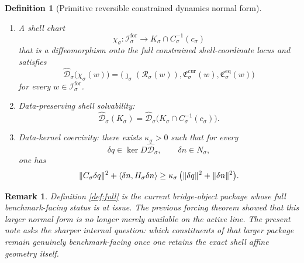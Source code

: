 \documentclass[11pt]{article}
\newcommand{\ForSpace}[1]{\mathcal I_{#1}^{\mathrm{for}}}
\newcommand{\Reduction}[1]{\mathcal R_{#1}}
\newcommand{\CurrentCarrier}[1]{\mathfrak C_{#1}^{\mathrm{cur}}}
\newcommand{\EqCarrier}[1]{\mathfrak C_{#1}^{\mathrm{eq}}}
\newcommand{\CoordSpace}[1]{Q_{#1}}
\newcommand{\CoordBody}[1]{K_{#1}}
\newcommand{\NormalSpace}[1]{N_{#1}}
\newcommand{\NormalBody}[1]{B_{#1}}
\newcommand{\AffineData}[1]{\widehat{\mathcal D}_{#1}}
\newcommand{\ConstraintMap}[1]{C_{#1}}
\newcommand{\ConstraintValue}[1]{c_{#1}}
\newcommand{\NormalOperator}[1]{H_{#1}}
\newcommand{\TimeRev}[1]{\tau_{#1}}
\newcommand{\ShellChart}[1]{\chi_{#1}}
\newtheorem{definition}{Definition}
\newtheorem{remark}{Remark}
\begin{document}
\begin{definition}[Primitive reversible constrained dynamics normal form]
\begin{enumerate}
    \[
    \TimeRev{\sigma}\in O(\CoordSpace{\sigma})\times O(\NormalSpace{\sigma})
    \]
    preserving \(\CoordBody{\sigma}\), \(\NormalBody{\sigma}\), \(\AffineData{\sigma}\), \(\ConstraintMap{\sigma}\), \(\ConstraintValue{\sigma}\), and \(\NormalOperator{\sigma}\).
    \item A shell chart
    \[
    \ShellChart{\sigma}:\ForSpace{\sigma}\to
    \CoordBody{\sigma}\cap \ConstraintMap{\sigma}^{-1}(\ConstraintValue{\sigma})
    \]
    that is a diffeomorphism onto the full constrained shell-coordinate locus and satisfies
    \begin{equation}
    \AffineData{\sigma}\bigl(\ShellChart{\sigma}(w)\bigr)
    =
    \bigl(
    \jmath_{\sigma}(\Reduction{\sigma}(w)),
    \CurrentCarrier{\sigma}(w),
    \EqCarrier{\sigma}(w)
    \bigr)
    \label{eq:fullcompat}
    \end{equation}
    for every \(w\in\ForSpace{\sigma}\).
    \item Data-preserving shell solvability:
    \begin{equation}
    \AffineData{\sigma}(\CoordBody{\sigma})
    =
    \AffineData{\sigma}
    \bigl(
    \CoordBody{\sigma}\cap\ConstraintMap{\sigma}^{-1}(\ConstraintValue{\sigma})
    \bigr).
    \label{eq:fullsolvability}
    \end{equation}
    \item Data-kernel coercivity: there exists \(\kappa_{\sigma}>0\) such that for every
    \[
    \delta q\in \ker D\AffineData{\sigma},
    \qquad
    \delta n\in \NormalSpace{\sigma},
    \]
    one has
    \begin{equation}
    \|\ConstraintMap{\sigma}\delta q\|^{2}
    +
    \ev{\delta n,\NormalOperator{\sigma}\delta n}
    \ge
    \kappa_{\sigma}\,
    \bigl(
    \|\delta q\|^{2}+\|\delta n\|^{2}
    \bigr).
    \label{eq:fullcoercive}
    \end{equation}
\end{enumerate}
\end{definition}

\begin{remark}
Definition \ref{def:full} is the current bridge-object package whose full benchmark-facing status is at issue. The previous forcing theorem showed that this larger normal form is no longer merely available on the active line. The present note asks the sharper internal question: which constituents of that larger package remain genuinely benchmark-facing once one retains the exact shell affine geometry itself.
\end{remark}
\end{document}
